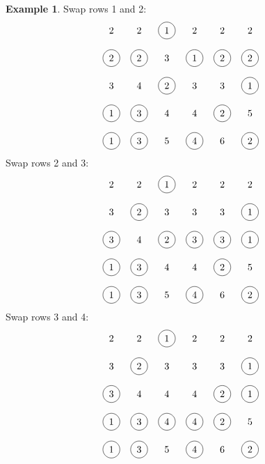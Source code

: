 \documentclass[reqno]{amsart}
\newcommand{\0}{\phantom{c}}
\theoremstyle{plain}
\theoremstyle{definition}
\newtheorem{example}[thm]{Example}
\numberwithin{equation}{section}
\begin{document}
\begin{example}
\noindent Swap rows 1 and 2:
\[
\begin{tikzpicture}\node at (0, 5){2};\node at (1, 5){2};\node[circle,draw=black] at (2, 5){1};\node at (3, 5){2};\node at (4, 5){2};\node at (5, 5){2};\node[circle, draw=black] at (0, 4){2};\node[circle, draw=black] at (1, 4){2};\node at (2, 4){3};\node[circle, draw=black] at (3, 4){1};\node[circle, draw=black] at (4, 4){2};\node[circle, draw=black] at (5, 4){2};\node at (0, 3){3};\node at (1, 3){4};\node[circle, draw=black] at (2, 3){2};\node at (3, 3){3};\node at (4, 3){3};\node[circle, draw=black] at (5, 3){1};\node[circle, draw=black] at (0, 2){1};\node[circle, draw=black] at (1, 2){3};\node at (2, 2){4};\node at (3, 2){4};\node[circle, draw=black] at (4, 2){2};\node at (5, 2){5};\node[circle, draw=black] at (0, 1){1};\node[circle, draw=black] at (1, 1){3};\node at (2, 1){5};\node[circle, draw=black] at (3, 1){4};\node at (4, 1){6};\node[circle, draw=black] at (5, 1){2};\end{tikzpicture}
\]
Swap rows 2 and 3:
\[
\begin{tikzpicture}\node at (0, 5){2};\node at (1, 5){2};\node[circle, draw=black] at (2, 5){1};\node at (3, 5){2};\node at (4, 5){2};\node at (5, 5){2};\node at (0, 4){3};\node[circle, draw=black] at (1, 4){2};\node at (2, 4){3};\node at (3, 4){3};\node at (4, 4){3};\node[circle, draw=black] at (5, 4){1};\node[circle, draw=black] at (0, 3){3};\node at (1, 3){4};\node[circle, draw=black] at (2, 3){2};\node[circle, draw=black] at (3, 3){3};\node[circle, draw=black] at (4, 3){3};\node[circle, draw=black] at (5, 3){1};\node[circle, draw=black] at (0, 2){1};\node[circle, draw=black] at (1, 2){3};\node at (2, 2){4};\node at (3, 2){4};\node[circle, draw=black] at (4, 2){2};\node at (5, 2){5};\node[circle, draw=black] at (0, 1){1};\node[circle, draw=black] at (1, 1){3};\node at (2, 1){5};\node[circle, draw=black] at (3, 1){4};\node at (4, 1){6};\node[circle, draw=black] at (5, 1){2};\end{tikzpicture}
\]
Swap rows 3 and 4:
\[
\begin{tikzpicture}\node at (0, 5){2};\node at (1, 5){2};\node[circle, draw=black] at (2, 5){1};\node at (3, 5){2};\node at (4, 5){2};\node at (5, 5){2};\node at (0, 4){3};\node[circle, draw=black] at (1, 4){2};\node at (2, 4){3};\node at (3, 4){3};\node at (4, 4){3};\node[circle, draw=black] at (5, 4){1};\node[circle, draw=black] at (0, 3){3};\node at (1, 3){4};\node at (2, 3){4};\node at (3, 3){4};\node[circle, draw=black] at (4, 3){2};\node[circle, draw=black] at (5, 3){1};\node[circle, draw=black] at (0, 2){1};\node[circle, draw=black] at (1, 2){3};\node[circle, draw=black] at (2, 2){4};\node[circle, draw=black] at (3, 2){4};\node[circle, draw=black] at (4, 2){2};\node at (5, 2){5};\node[circle, draw=black] at (0, 1){1};\node[circle, draw=black] at (1, 1){3};\node at (2, 1){5};\node[circle, draw=black] at (3, 1){4};\node at (4, 1){6};\node[circle, draw=black] at (5, 1){2};\end{tikzpicture}
\]
\end{example}
\end{document}
